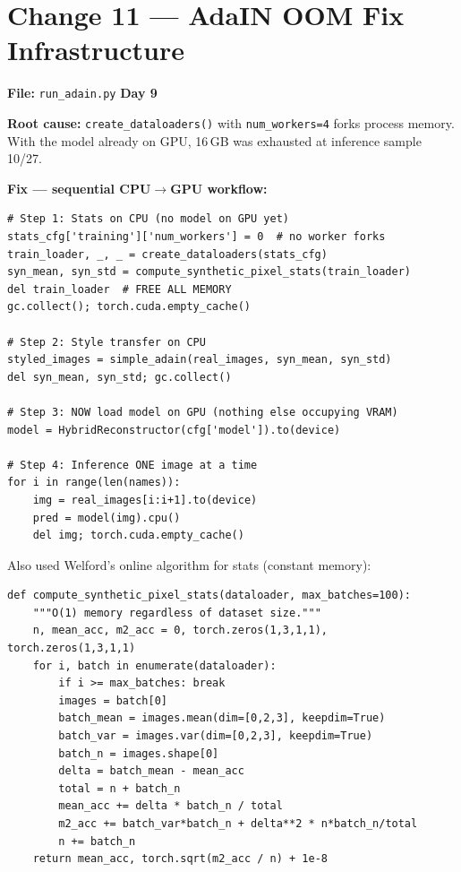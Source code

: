 \documentclass[10pt,a4paper]{article}
\begin{document}
\section*{Change 11 --- AdaIN OOM Fix \hfill \normalfont\small Infrastructure}

\textbf{File:} \texttt{run\_adain.py} \hfill \textbf{Day 9}

\textbf{Root cause:} \texttt{create\_dataloaders()} with \texttt{num\_workers=4} forks process memory. With the model already on GPU, 16\,GB was exhausted at inference sample 10/27.

\vspace{4pt}
\textbf{Fix --- sequential CPU$\to$GPU workflow:}
\begin{lstlisting}
# Step 1: Stats on CPU (no model on GPU yet)
stats_cfg['training']['num_workers'] = 0  # no worker forks
train_loader, _, _ = create_dataloaders(stats_cfg)
syn_mean, syn_std = compute_synthetic_pixel_stats(train_loader)
del train_loader  # FREE ALL MEMORY
gc.collect(); torch.cuda.empty_cache()

# Step 2: Style transfer on CPU
styled_images = simple_adain(real_images, syn_mean, syn_std)
del syn_mean, syn_std; gc.collect()

# Step 3: NOW load model on GPU (nothing else occupying VRAM)
model = HybridReconstructor(cfg['model']).to(device)

# Step 4: Inference ONE image at a time
for i in range(len(names)):
    img = real_images[i:i+1].to(device)
    pred = model(img).cpu()
    del img; torch.cuda.empty_cache()
\end{lstlisting}

Also used Welford's online algorithm for stats (constant memory):
\begin{lstlisting}
def compute_synthetic_pixel_stats(dataloader, max_batches=100):
    """O(1) memory regardless of dataset size."""
    n, mean_acc, m2_acc = 0, torch.zeros(1,3,1,1), torch.zeros(1,3,1,1)
    for i, batch in enumerate(dataloader):
        if i >= max_batches: break
        images = batch[0]
        batch_mean = images.mean(dim=[0,2,3], keepdim=True)
        batch_var = images.var(dim=[0,2,3], keepdim=True)
        batch_n = images.shape[0]
        delta = batch_mean - mean_acc
        total = n + batch_n
        mean_acc += delta * batch_n / total
        m2_acc += batch_var*batch_n + delta**2 * n*batch_n/total
        n += batch_n
    return mean_acc, torch.sqrt(m2_acc / n) + 1e-8
\end{lstlisting}
\end{document}
